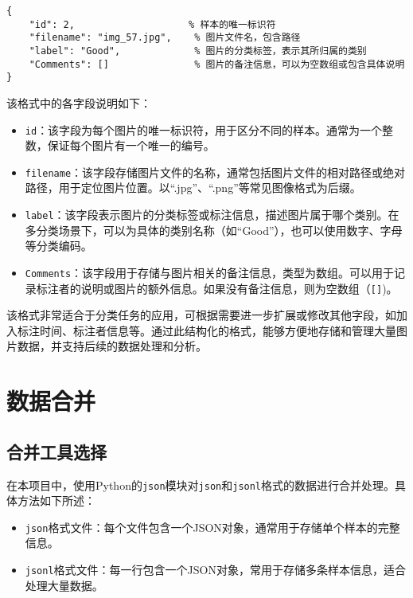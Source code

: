 \begin{lstlisting}
{
    "id": 2,                    % 样本的唯一标识符
    "filename": "img_57.jpg",    % 图片文件名，包含路径
    "label": "Good",             % 图片的分类标签，表示其所归属的类别
    "Comments": []               % 图片的备注信息，可以为空数组或包含具体说明
}
\end{lstlisting}

\noindent 该格式中的各字段说明如下：

\begin{itemize}
    \item \texttt{id}：该字段为每个图片的唯一标识符，用于区分不同的样本。通常为一个整数，保证每个图片有一个唯一的编号。
    \item \texttt{filename}：该字段存储图片文件的名称，通常包括图片文件的相对路径或绝对路径，用于定位图片位置。以“.jpg”、“.png”等常见图像格式为后缀。
    \item \texttt{label}：该字段表示图片的分类标签或标注信息，描述图片属于哪个类别。在多分类场景下，可以为具体的类别名称（如“Good”），也可以使用数字、字母等分类编码。
    \item \texttt{Comments}：该字段用于存储与图片相关的备注信息，类型为数组。可以用于记录标注者的说明或图片的额外信息。如果没有备注信息，则为空数组（\texttt{[]})。
\end{itemize}

\noindent 该格式非常适合于分类任务的应用，可根据需要进一步扩展或修改其他字段，如加入标注时间、标注者信息等。通过此结构化的格式，能够方便地存储和管理大量图片数据，并支持后续的数据处理和分析。

\section{数据合并}

\subsection{合并工具选择}

在本项目中，使用Python的\texttt{json}模块对\texttt{json}和\texttt{jsonl}格式的数据进行合并处理。具体方法如下所述：

\begin{itemize}
    \item \texttt{json}格式文件：每个文件包含一个JSON对象，通常用于存储单个样本的完整信息。
    \item \texttt{jsonl}格式文件：每一行包含一个JSON对象，常用于存储多条样本信息，适合处理大量数据。
\end{itemize}

